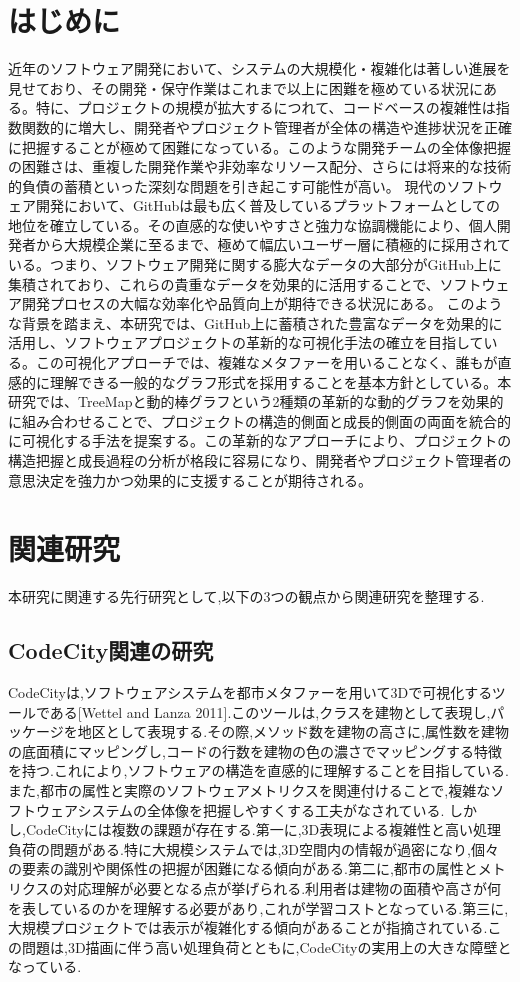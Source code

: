 \documentclass[12pt,twoside]{jbook}
\begin{document}
%
%
\chapter{はじめに}
近年のソフトウェア開発において、システムの大規模化・複雑化は著しい進展を見せており、その開発・保守作業はこれまで以上に困難を極めている状況にある。特に、プロジェクトの規模が拡大するにつれて、コードベースの複雑性は指数関数的に増大し、開発者やプロジェクト管理者が全体の構造や進捗状況を正確に把握することが極めて困難になっている。このような開発チームの全体像把握の困難さは、重複した開発作業や非効率なリソース配分、さらには将来的な技術的負債の蓄積といった深刻な問題を引き起こす可能性が高い。
現代のソフトウェア開発において、GitHubは最も広く普及しているプラットフォームとしての地位を確立している。その直感的な使いやすさと強力な協調機能により、個人開発者から大規模企業に至るまで、極めて幅広いユーザー層に積極的に採用されている。つまり、ソフトウェア開発に関する膨大なデータの大部分がGitHub上に集積されており、これらの貴重なデータを効果的に活用することで、ソフトウェア開発プロセスの大幅な効率化や品質向上が期待できる状況にある。
このような背景を踏まえ、本研究では、GitHub上に蓄積された豊富なデータを効果的に活用し、ソフトウェアプロジェクトの革新的な可視化手法の確立を目指している。この可視化アプローチでは、複雑なメタファーを用いることなく、誰もが直感的に理解できる一般的なグラフ形式を採用することを基本方針としている。本研究では、TreeMapと動的棒グラフという2種類の革新的な動的グラフを効果的に組み合わせることで、プロジェクトの構造的側面と成長的側面の両面を統合的に可視化する手法を提案する。この革新的なアプローチにより、プロジェクトの構造把握と成長過程の分析が格段に容易になり、開発者やプロジェクト管理者の意思決定を強力かつ効果的に支援することが期待される。

\chapter{関連研究}
本研究に関連する先行研究として,以下の3つの観点から関連研究を整理する.

\section{CodeCity関連の研究}
CodeCityは,ソフトウェアシステムを都市メタファーを用いて3Dで可視化するツールである[Wettel and Lanza 2011].このツールは,クラスを建物として表現し,パッケージを地区として表現する.その際,メソッド数を建物の高さに,属性数を建物の底面積にマッピングし,コードの行数を建物の色の濃さでマッピングする特徴を持つ.これにより,ソフトウェアの構造を直感的に理解することを目指している.また,都市の属性と実際のソフトウェアメトリクスを関連付けることで,複雑なソフトウェアシステムの全体像を把握しやすくする工夫がなされている.
しかし,CodeCityには複数の課題が存在する.第一に,3D表現による複雑性と高い処理負荷の問題がある.特に大規模システムでは,3D空間内の情報が過密になり,個々の要素の識別や関係性の把握が困難になる傾向がある.第二に,都市の属性とメトリクスの対応理解が必要となる点が挙げられる.利用者は建物の面積や高さが何を表しているのかを理解する必要があり,これが学習コストとなっている.第三に,大規模プロジェクトでは表示が複雑化する傾向があることが指摘されている.この問題は,3D描画に伴う高い処理負荷とともに,CodeCityの実用上の大きな障壁となっている.
\end{document}
